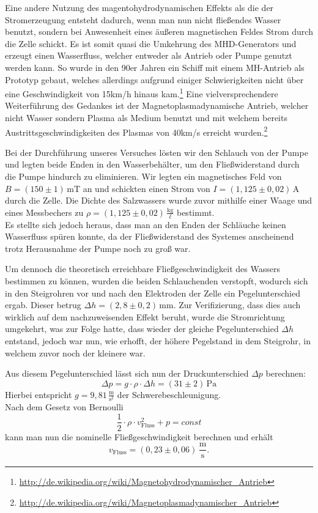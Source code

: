 \documentclass[11pt]{scrartcl}
\newcommand{\unit}[1]{\ensuremath{\,\mathrm{#1}}} %
\begin{document}
Eine andere Nutzung des magentohydrodynamischen Effekts als die der Stromerzeugung entsteht dadurch, wenn man nun nicht fließendes Wasser benutzt, sondern bei Anwesenheit eines äußeren magnetischen Feldes Strom durch die Zelle schickt. Es ist somit quasi die Umkehrung des MHD-Generators und erzeugt einen Wasserfluss, welcher entweder als Antrieb oder Pumpe genutzt werden kann. So wurde in den 90er Jahren ein Schiff mit einem MH-Antrieb als Prototyp gebaut, welches allerdings aufgrund einiger Schwierigkeiten nicht über eine Geschwindigkeit von 15km/h hinaus kam.\footnote{\url{http://de.wikipedia.org/wiki/Magnetohydrodynamischer\_Antrieb}} Eine vielversprechendere Weiterführung des Gedankes ist der Magnetoplasmadynamische Antrieb, welcher nicht Wasser sondern Plasma als Medium benutzt und mit welchem bereits Austrittsgeschwindigkeiten des Plasmas von 40km/s erreicht wurden.\footnote{\url{http://de.wikipedia.org/wiki/Magnetoplasmadynamischer\_Antrieb}}

Bei der Durchführung unseres Versuches lösten wir den Schlauch von der Pumpe und legten beide Enden in den Wasserbehälter, um den Fließwiderstand durch die Pumpe hindurch zu eliminieren. Wir legten ein magnetisches Feld von $ B = (150 \pm 1) \unit{mT} $ an und schickten einen Strom von $I = (1,125 \pm 0,02) \unit{A}$ durch die Zelle. Die Dichte des Salzwassers wurde zuvor mithilfe einer Waage und eines Messbechers zu $\rho = (1,125 \pm 0,02) \unit{\frac{kg}{\ell}}$ bestimmt.\\
Es stellte sich jedoch heraus, dass man an den Enden der Schläuche keinen Wasserfluss spüren konnte, da der Fließwiderstand des Systemes anscheinend trotz Herausnahme der Pumpe noch zu groß war.

Um dennoch die theoretisch erreichbare Fließgeschwindigkeit des Wassers bestimmen zu können, wurden die beiden Schlauchenden verstopft, wodurch sich in den Steigrohren vor und nach den Elektroden der Zelle ein Pegelunterschied ergab. Dieser betrug $\Delta h = (2,8 \pm 0,2) \unit{mm}$. Zur Verifizierung, dass dies auch wirklich auf dem nachzuweisenden Effekt beruht, wurde die Stromrichtung umgekehrt, was zur Folge hatte, dass wieder der gleiche Pegelunterschied $\Delta h$ entstand, jedoch war nun, wie erhofft, der höhere Pegelstand in dem Steigrohr, in welchem zuvor noch der kleinere war.

Aus diesem Pegelunterschied lässt sich nun der Druckunterschied $\Delta p$ berechnen:
\begin{equation}
\Delta p = g \cdot \rho \cdot \Delta h = (31 \pm 2) \unit{Pa}
\end{equation}
Hierbei entspricht $g = 9,81 \unit{\frac{m}{s^2}}$ der Schwerebeschleunigung.\\
Nach dem Gesetz von Bernoulli
\begin{equation}\frac{1}{2}\cdot\rho\cdot v^2_{\text{Fluss}} + p = const
\end{equation}
kann man nun die nominelle Fließgeschwindigkeit berechnen und erhält
\begin{equation}
v_{\text{Fluss}} = (0,23 \pm 0,06)\unit{\frac{m}{s}}.
\end{equation}
\end{document}

